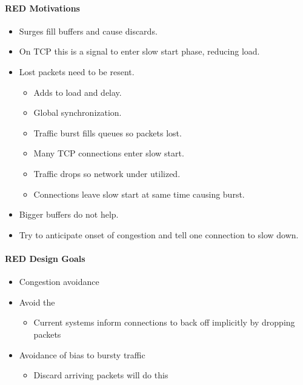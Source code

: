 \begin{definition}
\paragraph{RED Motivations}\label{par:Random_Early_Discard_Motivations}
\begin{itemize}[noitemsep]
\item Surges fill buffers and cause discards.
\item On TCP this is a signal to enter slow start phase, reducing load.
\item Lost packets need to be resent.
  \begin{itemize}[noitemsep]
  \item Adds to load and delay.
  \item Global synchronization.
  \item Traffic burst fills queues so packets lost.
  \item Many TCP connections enter slow start.
  \item Traffic drops so network under utilized.
  \item Connections leave slow start at same time causing burst.
  \end{itemize}
\item Bigger buffers do not help.
\item Try to anticipate onset of congestion and tell one connection to slow down.
\end{itemize}

\paragraph{RED Design Goals}\label{par:Random_Early_Discard_Design_Goals}
\begin{itemize}[noitemsep]
\item Congestion avoidance
\item Avoid the 
  \begin{itemize}[noitemsep]
  \item Current systems inform connections to back off implicitly by dropping packets
\end{itemize}

\item Avoidance of bias to bursty traffic
  \begin{itemize}[noitemsep]
  \item Discard arriving packets will do this
  \end{itemize}


\end{itemize}
\end{definition}
